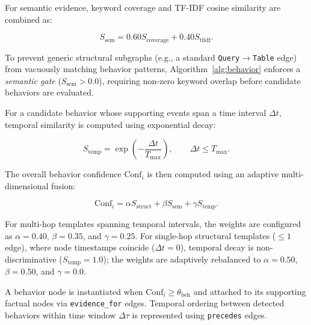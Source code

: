 \documentclass[conference]{IEEEtran}
\begin{document}
For semantic evidence, keyword coverage and TF-IDF cosine similarity are combined as:

\begin{equation}
S_{\mathrm{sem}}
=
0.60S_{\mathrm{coverage}} + 0.40S_{\mathrm{tfidf}} .
\end{equation}

To prevent generic structural subgraphs (e.g., a standard \texttt{Query}$\to$\texttt{Table} edge) from vacuously matching behavior patterns, Algorithm~\ref{alg:behavior} enforces a \emph{semantic gate} ($S_{\mathrm{sem}} > 0.0$), requiring non-zero keyword overlap before candidate behaviors are evaluated.

For a candidate behavior whose supporting events span a time interval $\Delta t$, temporal similarity is computed using exponential decay:

\begin{equation}
S_{\mathrm{temp}}
=
\exp\left(-\frac{\Delta t}{T_{\max}}\right),
\qquad
\Delta t \le T_{\max}.
\end{equation}

The overall behavior confidence $\mathrm{Conf}_i$ is then computed using an adaptive multi-dimensional fusion:

\begin{equation}
\mathrm{Conf}_i
=
\alpha S_{\mathrm{struct}}
+
\beta S_{\mathrm{sem}}
+
\gamma S_{\mathrm{temp}}.
\label{eq:behavior_conf}
\end{equation}

For multi-hop templates spanning temporal intervals, the weights are configured as $\alpha=0.40$, $\beta=0.35$, and $\gamma=0.25$. For single-hop structural templates ($\le 1$ edge), where node timestamps coincide ($\Delta t = 0$), temporal decay is non-discriminative ($S_{\mathrm{temp}}=1.0$); the weights are adaptively rebalanced to $\alpha=0.50$, $\beta=0.50$, and $\gamma=0.0$.

A behavior node is instantiated when $\mathrm{Conf}_i \ge \theta_{\mathrm{beh}}$ and attached to its supporting factual nodes via \texttt{evidence\_for} edges. Temporal ordering between detected behaviors within time window $\Delta\tau$ is represented using \texttt{precedes} edges.
\end{document}

